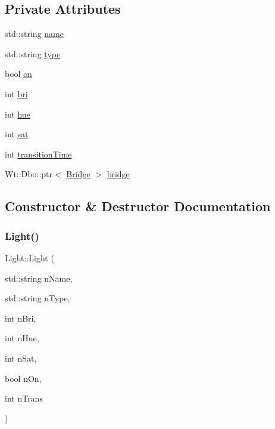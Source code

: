 \subsection*{Private Attributes}
\begin{DoxyCompactItemize}
\item 
std\+::string \hyperlink{class_light_aed2e518d1e739c50c31ae77a865f51ed}{name}
\item 
std\+::string \hyperlink{class_light_a2825ae88a1158e927a6d16bea9175e56}{type}
\item 
bool \hyperlink{class_light_a37ee0b241dbdaff4a13cc269de33a8bf}{on}
\item 
int \hyperlink{class_light_a34001347a7ae6d2b3e0b12cfedc9aadf}{bri}
\item 
int \hyperlink{class_light_ae488614d58a7f0dec6ed59b59c6c37e9}{hue}
\item 
int \hyperlink{class_light_afbfb00988ab1c1e0a07fa20941c6f2bf}{sat}
\item 
int \hyperlink{class_light_abd73358fde9001da39f147d878f9dab8}{transition\+Time}
\item 
Wt\+::\+Dbo\+::ptr$<$ \hyperlink{class_bridge}{Bridge} $>$ \hyperlink{class_light_ab1491281b58c62b7031fc668e9e5b506}{bridge}
\end{DoxyCompactItemize}


\subsection{Constructor \& Destructor Documentation}
\mbox{\label{class_light_aaeb13d35d2c08e223ca32e8382e83452}} 
\subsubsection{\texorpdfstring{Light()}{Light()}\hspace{0.1cm}{\footnotesize\ttfamily [1/2]}}
{\footnotesize\ttfamily Light\+::\+Light (\begin{DoxyParamCaption}\item[{std\+::string}]{n\+Name,  }\item[{std\+::string}]{n\+Type,  }\item[{int}]{n\+Bri,  }\item[{int}]{n\+Hue,  }\item[{int}]{n\+Sat,  }\item[{bool}]{n\+On,  }\item[{int}]{n\+Trans }\end{DoxyParamCaption})\hspace{0.3cm}{\ttfamily [inline]}}

